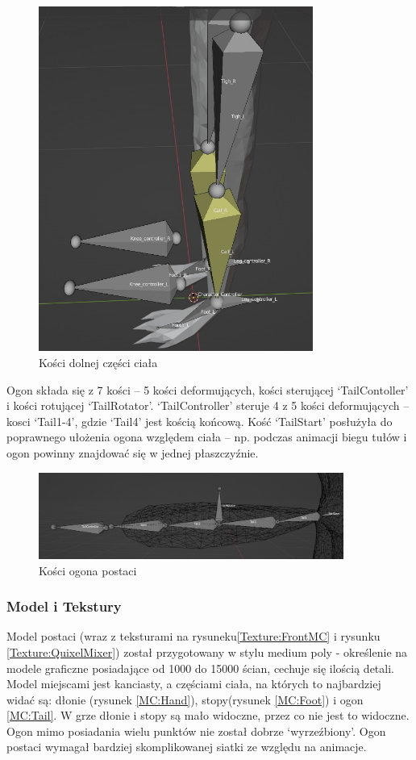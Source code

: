 \documentclass[12pt,twoside]{article}
\begin{document}
\begin{figure}[!h]
    \centering
	\includegraphics[width=9cm]{RealizacjaProjektu/MC/Bones_LowerBody.jpg}
	\caption{Kości dolnej części ciała}
    \label{Aramature:LowerBody}
\end{figure}

Ogon składa się z 7 kości -- 5 kości deformujących, kości sterującej
`TailContoller' i kości rotującej `TailRotator'. `TailController' steruje 4 z 5
kości deformujących -- kosci `Tail1-4', gdzie `Tail4' jest kością końcową. Kość
`TailStart' posłużyła do poprawnego ułożenia ogona względem ciała -- np. podczas
animacji biegu tułów i ogon powinny znajdować się w jednej płaszczyźnie.

\begin{figure}[!h]
    \centering
	\includegraphics[width=10cm]{RealizacjaProjektu/MC/Armature_tail.jpg}
	\caption{Kości ogona postaci}
    \label{Aramature:Tail}
\end{figure}

\clearpage 
\subsubsection{Model i Tekstury}
Model postaci (wraz z teksturami na rysuneku\ref{Texture:FrontMC} i
rysunku \ref{Texture:QuixelMixer}) został przygotowany w stylu medium poly -
określenie na modele graficzne posiadające od 1000 do 15000 ścian, cechuje się
ilością detali. Model miejscami jest kanciasty, a częściami ciała, na których to
najbardziej widać są: dłonie (rysunek \ref{MC:Hand}), stopy(rysunek
\ref{MC:Foot}) i ogon \ref{MC:Tail}. W grze dłonie i stopy są mało widoczne,
przez co nie jest to widoczne. Ogon mimo posiadania wielu punktów nie został
dobrze `wyrzeźbiony'. Ogon postaci wymagał bardziej skomplikowanej siatki ze
względu na animacje.
\end{document}
